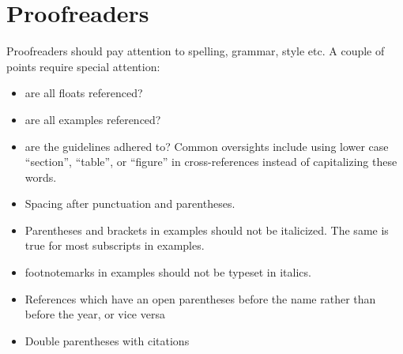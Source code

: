 \chapter{Proofreaders}
Proofreaders should pay attention to spelling, grammar, style etc. A couple of points require special attention:
\begin{itemize}
 \item are all floats referenced?
 \item are all examples referenced?
 \item are the guidelines adhered to? Common oversights include using lower case ``section'', ``table'', or ``figure'' in cross-references instead of capitalizing these words. 
 \item Spacing after punctuation and parentheses.
 \item Parentheses and brackets in examples should not be italicized. The same is true for most subscripts in examples.
 \item footnotemarks in examples should not be typeset in italics.
 \item References which have an open parentheses before the name rather than before the year, or vice versa
 \item Double parentheses with citations
\end{itemize}








